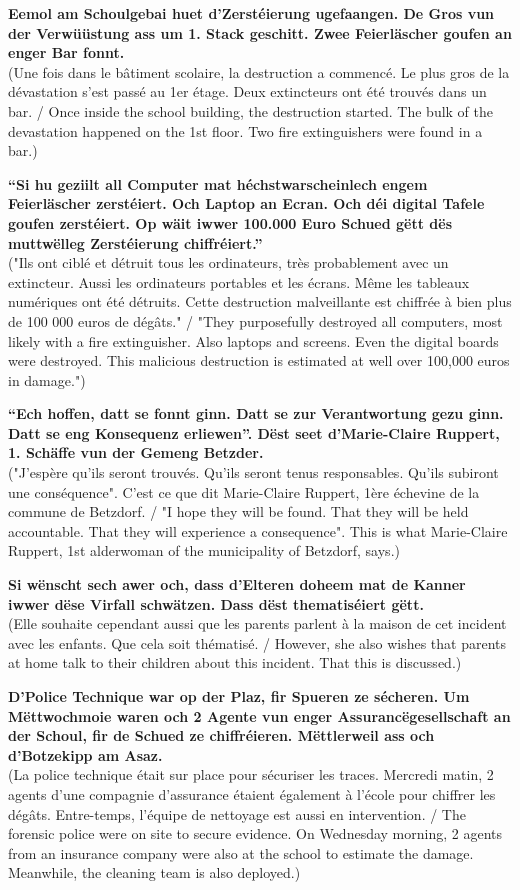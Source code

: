 \textbf{Eemol am Schoulgebai huet d’Zerstéierung ugefaangen. De Gros vun der Verwüüstung ass um 1. Stack geschitt. Zwee Feierläscher goufen an enger Bar fonnt.} \\
(Une fois dans le bâtiment scolaire, la destruction a commencé. Le plus gros de la dévastation s'est passé au 1er étage. Deux extincteurs ont été trouvés dans un bar. / Once inside the school building, the destruction started. The bulk of the devastation happened on the 1st floor. Two fire extinguishers were found in a bar.)

\textbf{“Si hu geziilt all Computer mat héchstwarscheinlech engem Feierläscher zerstéiert. Och Laptop an Ecran. Och déi digital Tafele goufen zerstéiert. Op wäit iwwer 100.000 Euro Schued gëtt dës muttwëlleg Zerstéierung chiffréiert.”} \\
("Ils ont ciblé et détruit tous les ordinateurs, très probablement avec un extincteur. Aussi les ordinateurs portables et les écrans. Même les tableaux numériques ont été détruits. Cette destruction malveillante est chiffrée à bien plus de 100 000 euros de dégâts." / "They purposefully destroyed all computers, most likely with a fire extinguisher. Also laptops and screens. Even the digital boards were destroyed. This malicious destruction is estimated at well over 100,000 euros in damage.")

\textbf{“Ech hoffen, datt se fonnt ginn. Datt se zur Verantwortung gezu ginn. Datt se eng Konsequenz erliewen”. Dëst seet d’Marie-Claire Ruppert, 1. Schäffe vun der Gemeng Betzder.} \\
("J'espère qu'ils seront trouvés. Qu'ils seront tenus responsables. Qu'ils subiront une conséquence". C'est ce que dit Marie-Claire Ruppert, 1ère échevine de la commune de Betzdorf. / "I hope they will be found. That they will be held accountable. That they will experience a consequence". This is what Marie-Claire Ruppert, 1st alderwoman of the municipality of Betzdorf, says.)

\textbf{Si wënscht sech awer och, dass d’Elteren doheem mat de Kanner iwwer dëse Virfall schwätzen. Dass dëst thematiséiert gëtt.} \\
(Elle souhaite cependant aussi que les parents parlent à la maison de cet incident avec les enfants. Que cela soit thématisé. / However, she also wishes that parents at home talk to their children about this incident. That this is discussed.)

\textbf{D’Police Technique war op der Plaz, fir Spueren ze sécheren. Um Mëttwochmoie waren och 2 Agente vun enger Assurancëgesellschaft an der Schoul, fir de Schued ze chiffréieren. Mëttlerweil ass och d’Botzekipp am Asaz.} \\
(La police technique était sur place pour sécuriser les traces. Mercredi matin, 2 agents d'une compagnie d'assurance étaient également à l'école pour chiffrer les dégâts. Entre-temps, l'équipe de nettoyage est aussi en intervention. / The forensic police were on site to secure evidence. On Wednesday morning, 2 agents from an insurance company were also at the school to estimate the damage. Meanwhile, the cleaning team is also deployed.)

